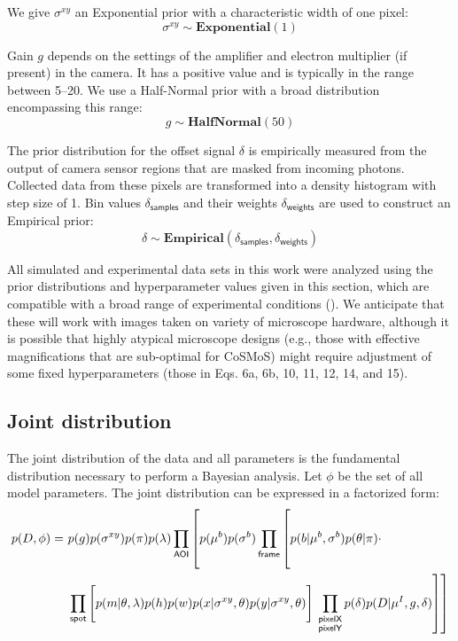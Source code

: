 We give $\sigma^{xy}$ an Exponential prior with a characteristic width of one pixel:
%
\begin{equation}
    \sigma^{xy} \sim \mathbf{Exponential}(1)
\end{equation}

Gain $g$ depends on the settings of the amplifier and electron multiplier (if present) in the camera. It has a positive value and is typically in the range between 5--20. We use a Half-Normal prior with a broad distribution encompassing this range:
%
\begin{equation}
    g \sim \mathbf{HalfNormal}(50)
\end{equation}

The prior distribution for the offset signal $\delta$ is empirically measured from the output of camera sensor regions that are masked from incoming photons. Collected data from these pixels are transformed into a density histogram with step size of 1. Bin values $\delta_\mathsf{samples}$ and their weights $\delta_\mathsf{weights}$ are used to construct an Empirical prior:
%
\begin{equation}
    \delta \sim \mathbf{Empirical}(\delta_\mathsf{samples}, \delta_\mathsf{weights})
\end{equation}

All simulated and experimental data sets in this work were analyzed using the prior distributions and hyperparameter values given in this section, which are compatible with a broad range of experimental conditions (). We anticipate that these will work with images taken on variety of microscope hardware, although it is possible that highly atypical microscope designs (e.g., those with effective magnifications that are sub-optimal for CoSMoS) might require adjustment of some fixed hyperparameters (those in Eqs. 6a, 6b, 10, 11, 12, 14, and 15).

\subsection{Joint distribution}

The joint distribution of the data and all parameters is the fundamental distribution necessary to perform a Bayesian analysis.  Let $\phi$ be the set of all model parameters. The joint distribution can be expressed in a factorized form:
%
\begin{equation}
\begin{aligned}
    p(D, \phi) =~&p(g) p(\sigma^{xy}) p(\pi) p(\lambda) \prod_{\mathsf{AOI}} \left[ p(\mu^b) p(\sigma^b) \prod_{\mathsf{frame}} \left[ \vphantom{\prod_{F}} p(b | \mu^b, \sigma^b) p(\theta | \pi) \vphantom{\prod_{\substack{\mathsf{pixelX} \\ \mathsf{pixelY}}}} \cdot \right. \right. \\
    &\prod_{\mathsf{spot}} \left[ \vphantom{\prod_{F}} p(m | \theta, \lambda) p(h) p(w) p(x | \sigma^{xy}, \theta) p(y | \sigma^{xy}, \theta) \right] \left. \left. \prod_{\substack{\mathsf{pixelX} \\ \mathsf{pixelY}}} p(\delta) p(D | \mu^I, g, \delta) \right] \right]
\end{aligned}
\end{equation}

